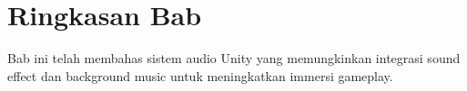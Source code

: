 \section{Ringkasan Bab}

Bab ini telah membahas sistem audio Unity yang memungkinkan integrasi sound effect dan background music untuk meningkatkan immersi gameplay.
